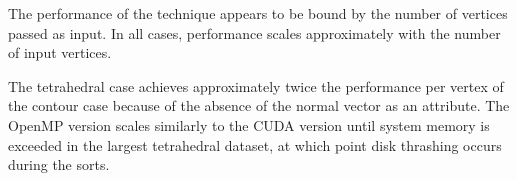 \documentclass[10pt,journal,cspaper,compsoc]{IEEEtran}
\begin{document}


The performance of the technique appears to be bound by the number of vertices passed as input. In all cases, performance scales approximately with the number of input vertices. 

The tetrahedral case achieves approximately twice the performance per vertex of the contour case because of the absence of the normal vector as an attribute. The OpenMP version scales similarly to the CUDA version until system memory is exceeded in the largest tetrahedral dataset, at which point disk thrashing occurs during the sorts.
\end{document}
